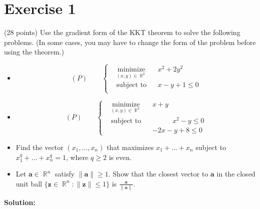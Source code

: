 \documentclass{article}
\DeclareMathOperator{\R}{\mathbb R}
\newcommand{\mb}{\mathbf}
\begin{document}
\section*{Exercise 1}
(28 points) Use the gradient form of the KKT theorem to solve the following problems. (In some cases, you may have to change the form of the problem before using the theorem.)
\begin{itemize}
\item \begin{equation*}
(P)\qquad\left\{\begin{aligned}
& \underset{  (x,y) \in \R^2}{\text{minimize}}
& & x^2 + 2y^2 \\
& \text{subject to} && x-y+1 \leq 0 \\
\end{aligned}\right.
\end{equation*}
\item \begin{equation*}
(P)\qquad\left\{\begin{aligned}
& \underset{  (x,y) \in \R^2}{\text{minimize}}
& & x+y \\
& \text{subject to} && \phantom{xxxxx} x^2 - y \leq 0 \\
& && -2x-y+8 \leq 0
\end{aligned}\right.
\end{equation*}
\item Find the vector $(x_1, \dots, x_n)$ that maximizes $x_1 + \dots + x_n$ subject to $x_1^q + \dots + x_n^q = 1$, where $q \geq2$ is even.
\item Let $\mb a \in \R^n$ satisfy $\|\mb a\| \geq 1$. Show that the closest vector to $\mb a$ in the closed unit ball $\{\mb z \in \R^n: \|\mb z \| \leq 1\}$ is $\frac{\mb a}{\|\mb a\|}$.
\end{itemize}

\textbf{Solution:} \\
\end{document}
